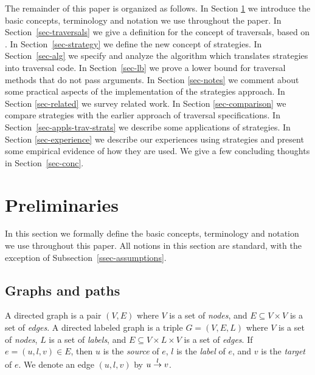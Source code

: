 The remainder of this paper is organized as follows.  In Section
\ref{sec-prel} we introduce the basic concepts, terminology and
notation we use throughout the paper.  In Section~\ref{sec-traversals}
we give a definition for the concept of traversals, based on
\cite{gener-comp-j:jens-boaz-karl}.  In Section~\ref{sec-strategy} we
define the new concept of strategies.  In Section~\ref{sec-alg} we
specify and analyze the algorithm which translates strategies into
traversal code.  In Section~\ref{sec-lb} we prove a lower bound for
traversal methods that do not pass arguments.  In Section
\ref{sec-notes} we comment about some practical aspects of the
implementation of the strategies approach.  In Section
\ref{sec-related} we survey related work.  In Section
\ref{sec-comparison} we compare strategies with the earlier approach
of traversal specifications.  In Section~\ref{sec-appls-trav-strats}
we describe some applications of strategies.  In Section
\ref{sec-experience} we describe our experiences using strategies and
present some empirical evidence of how they are used.  We give a few
concluding thoughts in Section~\ref{sec-conc}.

\section{Preliminaries}
\label{sec-prel}
In this section we formally define the basic concepts, terminology and
notation we use throughout this paper. All notions in this section are
standard, with the exception of Subsection~\ref{ssec-assumptions}.

\subsection{Graphs and paths}
A directed graph is a pair $(V,E)$ where $V$ is a set of {\em nodes},
and $E\subseteq V\times V$ is a set of {\em edges}.  A directed
labeled graph is a triple $G=(V,E,L)$ where $V$ is a set of {\em
nodes}, $L$ is a set of {\em labels}, and $E\subseteq V \times L
\times V$ is a set of {\em edges}.  If $e=(u,l,v) \in E$, then $u$ is
the {\em source} of $e$, $l$ is the {\em label} of $e$, and $v$ is the
{\em target} of $e$.  We denote an edge $(u,l,v)$ by $u\stackrel{l}{\rightarrow}v$.


